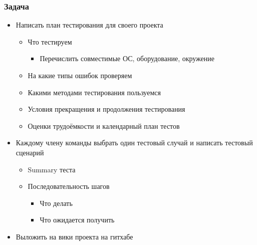 \documentclass[xetex,mathserif,serif]{beamer}
\begin{document}
	\begin{frame}
		\frametitle{Задача}
		\begin{itemize}
			\item Написать план тестирования для своего проекта
			\begin{itemize}
				\item Что тестируем
				\begin{itemize}
					\item Перечислить совместимые ОС, оборудование, окружение
				\end{itemize}
				\item На какие типы ошибок проверяем
				\item Какими методами тестирования пользуемся
				\item Условия прекращения и продолжения тестирования
				\item Оценки трудоёмкости и календарный план тестов
			\end{itemize}
			\item Каждому члену команды выбрать один тестовый случай и написать тестовый сценарий
			\begin{itemize}
				\item Summary теста
				\item Последовательность шагов
				\begin{itemize}
					\item Что делать
					\item Что ожидается получить
				\end{itemize}
			\end{itemize}
			\item Выложить на вики проекта на гитхабе
		\end{itemize}
	\end{frame}
\end{document}
